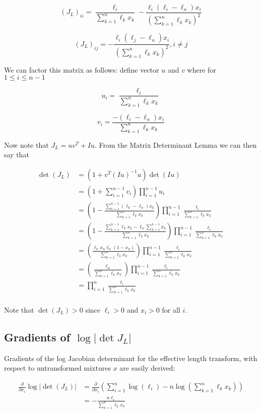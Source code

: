 \documentclass{article}
\begin{document}
$$(J_L)_{ii} =
\frac{\ell_i}{\sum_{k=1}^{n} \ell_k x_k} - \frac{\ell_i (\ell_i - \ell_n) x_i}{(\sum_{k=1}^{n} \ell_k x_k)^2}$$

$$(J_L)_{ij} = - \frac{\ell_i (\ell_j - \ell_n) x_i}{(\sum_{k=1}^{n} \ell_k x_k)^2}, i \neq j$$

We can factor this matrix as follows: define vector $u$ and $v$ where for $1
\leq i \leq n-1$

$$u_i = \frac{\ell_i}{\sum_{k=1}^{n} \ell_k x_k}$$

$$v_i = \frac{-(\ell_i - \ell_n) x_i}{\sum_{k=1}^{n} \ell_k x_k}$$

Now note that $J_L = uv^{T} + Iu$. From the Matrix Determinant Lemma we can then say that

\begin{align*}
\det(J_L) &= (1 + v^{T}(Iu)^{-1}u) \det (Iu) \\
    &= \left(1 + \sum_{i=1}^{n-1} v_i \right) \prod_{i=1}^{n-1} {u_i} \\
    &= \left(1 - \frac{\sum_{k=1}^{n-1} (\ell_k - \ell_n) x_k}
                      {\sum_{k=1}^{n} \ell_k x_k} \right) 
       \prod_{i=1}^{n-1} \frac{\ell_i}{\sum_{k=1}^{n} \ell_k x_k} \\
    &= \left(1 - \frac{\sum_{k=1}^{n-1} \ell_k x_k -
                       \ell_n \sum_{k=1}^{n-1} x_k}
                      {\sum_{k=1}^{n} \ell_k x_k} \right)
       \prod_{i=1}^{n-1} \frac{\ell_i}{\sum_{k=1}^{n} \ell_k x_k} \\
    &= \left(\frac{\ell_n x_n  \ell_n (1 - x_n)}
                      {\sum_{k=1}^{n} \ell_k x_k} \right)
       \prod_{i=1}^{n-1} \frac{\ell_i}{\sum_{k=1}^{n} \ell_k x_k} \\
    &= \left(\frac{\ell_n}{\sum_{k=1}^{n} \ell_k x_k} \right)
       \prod_{i=1}^{n-1} \frac{\ell_i}{\sum_{k=1}^{n} \ell_k x_k} \\
    &= \prod_{i=1}^{n} \frac{\ell_i}{\sum_{k=1}^{n} \ell_k x_k} \\
\end{align*}

Note that $\det(J_L) > 0$ since $\ell_i > 0$ and $x_i > 0$ for all $i$.

\subsection{Gradients of $\log |\det J_L|$}

Gradients of the log Jacobian determinant for the effective length transform,
with respect to untransformed mixtures $x$ are easily derived:

\begin{align*}
\frac{\partial}{\partial x_i}  \log |\det(J_L)| &=
    \frac{\partial}{\partial x_i} \left( \sum_{i=1}^{n} \log(\ell_i) - n \log \left( \sum_{k=1}^{n} \ell_k x_k \right) \right) \\
    &= -\frac{n \ell_i}{\sum_{k=1}^{n} \ell_k x_k}
\end{align*}
\end{document}
